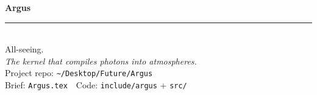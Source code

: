 \documentclass[11pt]{article}
\begin{document}
\thispagestyle{empty}
\vspace*{2cm}
\begin{center}
{\color{primary}\Huge\bfseries Argus}\\[0.6em]
{\color{accent}\rule{0.18\textwidth}{1.2pt}}\\[0.6em]
{\color{dark}\Large All-seeing.}\\[0.3em]
{\color{muted}\itshape The kernel that compiles photons into atmospheres.}\\[2.4em]
{\color{muted}\small Project repo: \texttt{\textasciitilde/Desktop/Future/Argus}}\\[0.4em]
{\color{muted}\small Brief: \texttt{Argus.tex} \,\textbullet\, Code: \texttt{include/argus} + \texttt{src/}}
\end{center}
\end{document}
